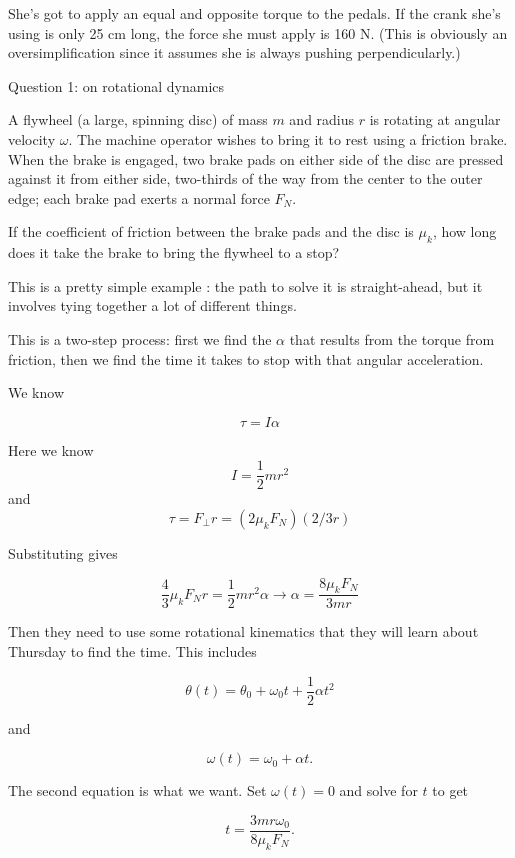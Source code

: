 \documentclass[12pt]{article}
\begin{document}
{\color{red} She's got to apply an equal and opposite torque to the pedals. If the crank she's using is only 25 cm long, the force she must apply is 160 N. (This is obviously an oversimplification since it assumes she is always pushing perpendicularly.)}

\newpage

\Large
\centerline{}
\normalsize
\centerline{}


\centerline{\large Question 1: on rotational dynamics}
A flywheel (a large, spinning disc) of mass $m$ and radius $r$ is rotating
at angular velocity $\omega$. The machine operator wishes to bring it to rest using a friction brake. When the brake
is engaged, two brake pads on either side of the disc are pressed against it from either side, two-thirds
of the way from the center to the outer edge; each brake pad
exerts a normal force $F_N$.

If the coefficient of friction between the brake pads and the disc is $\mu_k$, how long does it take the
brake to bring the flywheel to a stop?

{\color{red}

This is a pretty simple example : the path to solve it is straight-ahead, but it involves tying together a lot of different things.

This is a two-step process: first we find the $\alpha$ that results from the torque from friction, then we find the time it takes to stop with that angular acceleration.

We know 

$$\tau = I \alpha$$

Here we know $$I=\frac{1}{2}mr^2$$ and $$\tau = F_\perp r = (2 \mu_k F_N)(2/3 r)$$

Substituting gives

$$\frac{4}{3} \mu_k F_N r = \frac{1}{2}mr^2 \alpha \rightarrow \alpha = \frac{8\mu_k F_N}{3mr}$$

Then they need to use some rotational kinematics that they will learn about Thursday to find the time. This includes 
	
	$$\theta(t) = \theta_0 + \omega_0 t + \frac{1}{2}\alpha t^2$$
	
	and
	
	$$\omega(t) = \omega_0 + \alpha t.$$
	
The second equation is what we want. Set $\omega(t)=0$ and solve for $t$ to get

$$t = \frac{3mr\omega_0}{8\mu_k F_N}.$$

}
	
\end{document}
